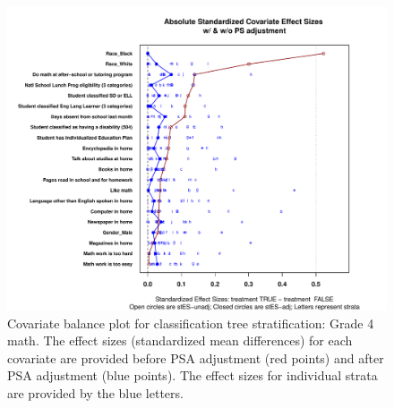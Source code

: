 \begin{figure}
\begin{center}
\includegraphics[width=\textwidth]{../Figures2009/g4math-tree-balance.pdf}
\caption[Covariate balance plot for classification tree stratification: Grade 4 math]{Covariate balance plot for classification tree stratification: Grade 4 math. The effect sizes (standardized mean differences) for each covariate are provided before PSA adjustment (red points) and after PSA adjustment (blue points). The effect sizes for individual strata are provided by the blue letters.}
\end{center}
\end{figure}

